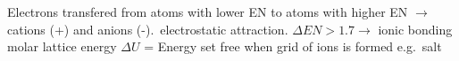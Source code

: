 Electrons transfered from atoms with lower EN to atoms with higher EN $\rightarrow$ cations (+) and anions (-).\ electrostatic attraction. $\Delta EN > 1.7 \rightarrow$ ionic bonding\\
molar lattice energy $\Delta U$ = Energy set free when grid of ions is formed e.g.\ salt